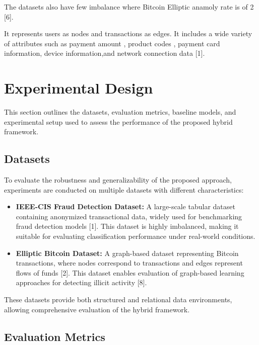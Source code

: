 \documentclass[conference]{IEEEtran}
\begin{document}
The datasets also have few imbalance where Bitcoin Elliptic anamoly rate is of 2 [6].

It represents users as nodes and transactions as edges. It includes a wide variety of attributes such as payment amount , product codes , payment card information, device information,and network connection data [1].


\section{Experimental Design}

This section outlines the datasets, evaluation metrics, baseline models, and experimental setup used to assess the performance of the proposed hybrid framework.

\subsection{Datasets}

To evaluate the robustness and generalizability of the proposed approach, experiments are conducted on multiple datasets with different characteristics:

\begin{itemize}
    \item \textbf{IEEE-CIS Fraud Detection Dataset:}  
    A large-scale tabular dataset containing anonymized transactional data, widely used for benchmarking fraud detection models [1]. This dataset is highly imbalanced, making it suitable for evaluating classification performance under real-world conditions.

    \item \textbf{Elliptic Bitcoin Dataset:}  
    A graph-based dataset representing Bitcoin transactions, where nodes correspond to transactions and edges represent flows of funds [2]. This dataset enables evaluation of graph-based learning approaches for detecting illicit activity [8].
\end{itemize}

These datasets provide both structured and relational data environments, allowing comprehensive evaluation of the hybrid framework.

\subsection{Evaluation Metrics}
\end{document}

